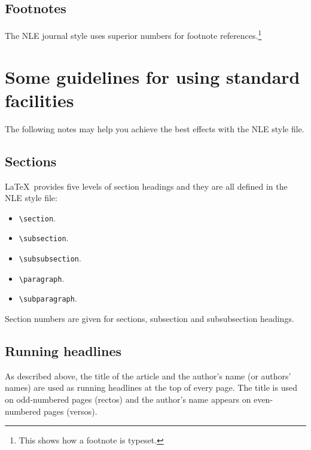 \documentclass{nle}
\begin{document}
\subsection{Footnotes}

The NLE journal style uses superior numbers for footnote
references.\footnote{This shows how a footnote is typeset.}

\section{Some guidelines for using standard facilities}

The following notes may help you achieve the best effects with the NLE style
file.

\subsection{Sections}

\LaTeX\ provides five levels of section headings and they are all
defined in the NLE style file:
\begin{itemize}
  \item \verb"\section".
  \item \verb"\subsection".
  \item \verb"\subsubsection".
  \item \verb"\paragraph".
  \item \verb"\subparagraph".
\end{itemize}
Section numbers are given for sections, subsection and subsubsection headings.

\subsection{Running headlines}

As described above, the title of the article and the author's name (or authors'
names) are used as running headlines at the top of every page.
The title is used on odd-numbered pages (rectos) and the author's name appears
on even-numbered pages (versos).
\end{document}
